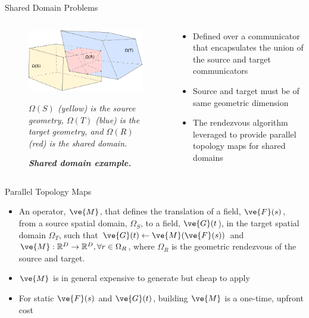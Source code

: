 \documentclass{beamer}
\begin{document}
\begin{frame}{Shared Domain Problems}

  \begin{columns}
    
    \begin{column}{0.5\textwidth}
      \begin{figure}[htpb!]
        \centering \includegraphics[width=2.5in]{overlapping_domain.pdf}
        \caption{\bf \sl Shared domain example.} {\sl $\Omega(S)$ (yellow)
          is the source geometry, $\Omega(T)$ (blue) is the target geometry,
          and $\Omega(R)$ (red) is the shared domain.}
        \label{fig:shared_domain}
      \end{figure}
    \end{column}

    \begin{column}{0.5\textwidth}
      \begin{itemize}
      \item Defined over a communicator that encapsulates the union of
        the source and target communicators
        \medskip
      \item Source and target must be of same geometric dimension
        \medskip
      \item The rendezvous algorithm leveraged to provide parallel
        topology maps for shared domains
      \end{itemize}
    \end{column}

  \end{columns}

\end{frame}

\begin{frame}{Parallel Topology Maps}

  \begin{itemize}
  \item An operator, $\ve{M}$, that defines the translation of a
    field, $\ve{F}(s)$, from a source spatial domain, $\Omega_S$, to a
    field, $\ve{G}(t$), in the target spatial domain $\Omega_T$, such
    that $\ve{G}(t)\leftarrow \ve{M}(\ve{F}(s))$ and $\ve{M}:
    \mathbb{R}^D \rightarrow \mathbb{R}^D, \forall r \in \Omega_R$,
    where $\Omega_R$ is the geometric rendezvous of the source and
    target.
    \medskip
  \item $\ve{M}$ is in general expensive to generate but cheap to
    apply
    \medskip
  \item For static $\ve{F}(s)$ and $\ve{G}(t)$, building $\ve{M}$ is a
    one-time, upfront cost
  \end{itemize}

\end{frame}
\end{document}
